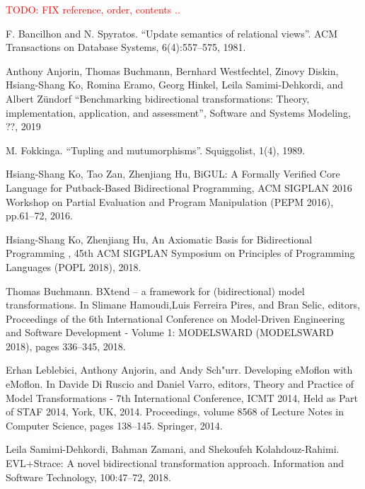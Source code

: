 \documentclass[runningheads]{llncs}
\begin{document}





\textcolor{red}{TODO: FIX reference, order, contents ..}

% 
%
%
% 
% 
%
\begin{thebibliography}{8}
F. Bancilhon and N. Spyratos. ``Update semantics of relational views''. ACM Transactions on Database Systems, 6(4):557--575, 1981.

Anthony Anjorin, Thomas Buchmann, Bernhard Westfechtel, Zinovy Diskin, Hsiang-Shang Ko, Romina Eramo, Georg Hinkel, Leila Samimi-Dehkordi, and Albert Zündorf
``Benchmarking bidirectional transformations: Theory, implementation, application, and assessment'', Software and Systems Modeling, ??, 2019

  M. Fokkinga. ``Tupling and mutumorphisms''. Squiggolist, 1(4), 1989.

  Hsiang-Shang Ko, Tao Zan, Zhenjiang Hu, BiGUL: A Formally Verified Core Language for Putback-Based Bidirectional Programming, ACM SIGPLAN 2016 Workshop on Partial Evaluation and Program Manipulation (PEPM 2016), pp.61--72, 2016.

  Hsiang-Shang Ko, Zhenjiang Hu, An Axiomatic Basis for Bidirectional Programming , 45th ACM SIGPLAN Symposium on Principles of Programming Languages (POPL 2018), 2018.

  Thomas Buchmann. BXtend -- a framework for (bidirectional) model transformations. In Slimane Hamoudi,Luis Ferreira Pires, and Bran Selic, editors, Proceedings
of the 6th International Conference on Model-Driven Engineering and Software Development - Volume 1: MODELSWARD (MODELSWARD 2018), pages 336--345, 2018.

  Erhan Leblebici, Anthony Anjorin, and Andy Sch"{u}rr. Developing eMoflon with eMoflon. In Davide Di Ruscio and Daniel Varro, editors, Theory and Practice of Model Transformations - 7th International Conference, ICMT 2014, Held as Part of STAF 2014, York, UK, 2014. Proceedings, volume 8568 of Lecture Notes in
Computer Science, pages 138–145. Springer, 2014.

Leila Samimi-Dehkordi, Bahman Zamani, and Shekoufeh Kolahdouz-Rahimi. EVL+Strace: A novel bidirectional transformation approach. Information and Software
Technology, 100:47--72, 2018.


\end{thebibliography}
\end{document}

